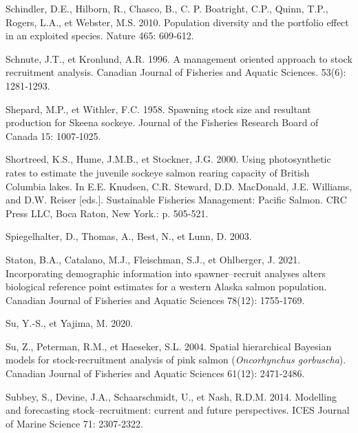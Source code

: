 \documentclass[french,11pt]{book}
\begin{document}
\begin{CSLReferences}{1}{0}
Schindler, D.E., Hilborn, R., Chasco, B., C. P. Boatright, C.P., Quinn, T.P., Rogers, L.A., et Webster, M.S. 2010. {Population diversity and the portfolio effect in an exploited species}. {Nature} 465: 609‑612.

Schnute, J.T., et Kronlund, A.R. 1996. {A management oriented approach to stock recruitment analysis}. {Canadian Journal of Fisheries and Aquatic Sciences.} 53(6): 1281‑1293.

Shepard, M.P., et Withler, F.C. 1958. {Spawning stock size and resultant production for Skeena sockeye}. Journal of the Fisheries Research Board of Canada 15: 1007‑1025.

Shortreed, K.S., Hume, J.M.B., et Stockner, J.G. 2000. {Using photosynthetic rates to estimate the juvenile sockeye salmon rearing capacity of British Columbia lakes}. {In E.E. Knudsen, C.R. Steward, D.D. MacDonald, J.E. Williams, and D.W. Reiser {[}eds.{]}. Sustainable Fisheries Management: Pacific Salmon. CRC Press LLC, Boca Raton, New York.}: p. 505‑521.

Spiegelhalter, D., Thomas, A., Best, N., et Lunn, D. 2003.

Staton, B.A., Catalano, M.J., Fleischman, S.J., et Ohlberger, J. 2021. {Incorporating demographic information into spawner--recruit analyses alters biological reference point estimates for a western Alaska salmon population}. Canadian Journal of Fisheries and Aquatic Sciences 78(12): 1755‑1769.

Su, Y.-S., et Yajima, M. 2020.

Su, Z., Peterman, R.M., et Haeseker, S.L. 2004. {Spatial hierarchical Bayesian models for stock-recruitment analysis of pink salmon (\emph{Oncorhynchus gorbuscha})}. Canadian Journal of Fisheries and Aquatic Sciences 61(12): 2471‑2486.

Subbey, S., Devine, J.A., Schaarschmidt, U., et Nash, R.D.M. 2014. Modelling and forecasting stock--recruitment: current and future perspectives. ICES Journal of Marine Science 71: 2307‑2322.


\end{CSLReferences}
\end{document}
